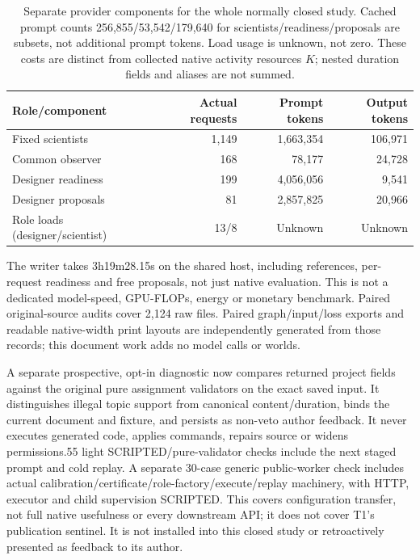 \begin{table}[t]
\centering\small
\begin{tabular}{lrrr}
\toprule
Role/component & Actual requests & Prompt tokens & Output tokens \\
\midrule
Fixed scientists & 1,149 & 1,663,354 & 106,971 \\
Common observer & 168 & 78,177 & 24,728 \\
Designer readiness & 199 & 4,056,056 & 9,541 \\
Designer proposals & 81 & 2,857,825 & 20,966 \\
Role loads (designer/scientist) & 13/8 & Unknown & Unknown \\
\bottomrule
\end{tabular}
\caption{Separate provider components for the whole normally closed study.
Cached prompt counts 256,855/53,542/179,640 for scientists/readiness/proposals
are subsets, not additional prompt tokens. Load usage is unknown, not zero.
These costs are distinct from collected native activity resources $K$;
nested duration fields and aliases are not summed.}
\label{tab:native-topic-role-costs}
\end{table}

The writer takes 3h19m28.15s on the shared host, including references,
per-request readiness and free proposals, not just native evaluation. This
is not a dedicated model-speed, GPU-FLOPs, energy or monetary benchmark.
Paired original-source audits cover 2,124 raw files. Paired graph/input/loss
exports and readable native-width print layouts are independently generated
from those records; this document work adds no model calls or worlds.

A separate prospective, opt-in diagnostic now compares returned project
fields against the original pure assignment validators on the exact saved
input. It distinguishes illegal topic support from canonical content/duration,
binds the current document and fixture, and persists as non-veto author
feedback. It never executes generated code, applies commands, repairs source
or widens permissions.55 light SCRIPTED/pure-validator checks include the
next staged prompt and cold replay. A separate 30-case generic public-worker
check includes actual calibration/certificate/role-factory/execute/replay
machinery, with HTTP, executor and child supervision SCRIPTED. This covers
configuration transfer, not full native usefulness or every downstream API;
it does not cover T1's publication sentinel. It is not installed into this
closed study or retroactively presented as feedback to its author.


